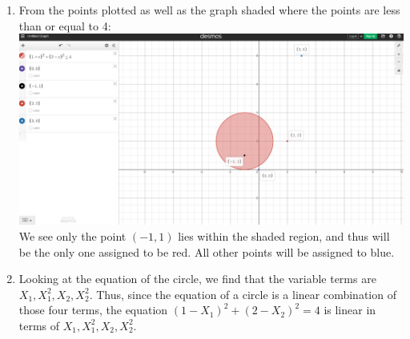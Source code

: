 \documentclass[12pt]{exam}
\begin{document}
\begin{enumerate}
\begin{enumerate}
        \item From the points plotted as well as the graph shaded where the points are 
        less than or equal to 4: \\ 
        \includegraphics[scale = .3]{2c.png}\\
        We see only the point $(-1, 1)$ lies within the shaded region, and thus will 
        be the only one assigned to be red. All other points will be assigned to blue. 

        \item Looking at the equation of the circle, we find that the variable terms are 
        $X_1, X_1^2, X_2, X_2^2$. Thus, since the equation of a circle is a linear 
        combination of those four terms, the equation $(1-X_1)^2 + (2-X_2)^2 = 4$ is linear 
        in terms of $X_1, X_1^2, X_2, X_2^2$. 
    \end{enumerate}
\end{enumerate}
\end{document}
